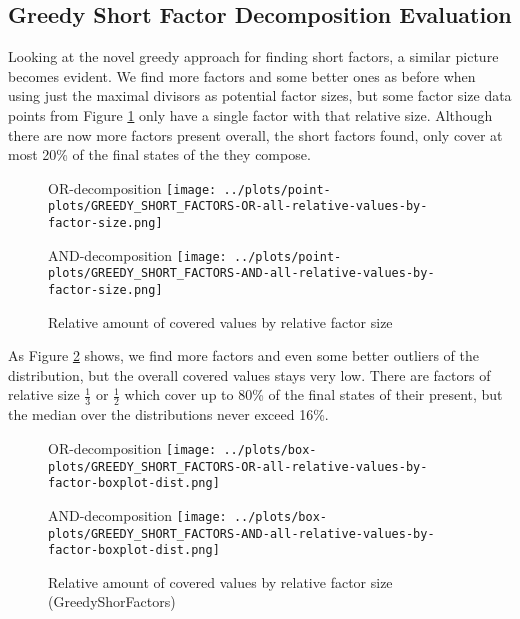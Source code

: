 \subsection{Greedy Short Factor Decomposition Evaluation}
Looking at the novel greedy approach for finding short factors, a similar picture becomes evident.
We find more factors and some better ones as before when using just the maximal divisors as potential factor sizes, but some factor size data points from Figure \ref{fig:eval:greedy-short-factors-all-factors} only have a single factor with that relative size.
Although there are now more factors present overall, the short factors found, only cover at most 20\% of the final states of the \DFA they compose.
\begin{figure}[h]
	\begin{minipage}[h]{0.49\linewidth}
		\centering
		OR-decomposition
		\texttt{[image: ../plots/point-plots/GREEDY\_SHORT\_FACTORS-OR-all-relative-values-by-factor-size.png]}
	\end{minipage}
	\begin{minipage}[h]{0.49\linewidth}
		\centering
		AND-decomposition
		\texttt{[image: ../plots/point-plots/GREEDY\_SHORT\_FACTORS-AND-all-relative-values-by-factor-size.png]}
	\end{minipage}
	\caption{Relative amount of covered values by relative factor size}
	\label{fig:eval:greedy-short-factors-all-factors}
\end{figure}
As Figure \ref{fig:eval:greedy-short-factors-all-factors-box-plot} shows, we find more factors and even some better outliers of the distribution, but the overall covered values stays very low. There are factors of relative size $\frac{1}{3}$ or $\frac{1}{2}$ which cover up to 80\% of the final states of their \DFA present, but the median over the distributions never exceed 16\%. 
\begin{figure}[t]
	\begin{minipage}[h]{0.49\linewidth}
		\centering
		OR-decomposition
		\texttt{[image: ../plots/box-plots/GREEDY\_SHORT\_FACTORS-OR-all-relative-values-by-factor-boxplot-dist.png]}
	\end{minipage}
	\begin{minipage}[h]{0.49\linewidth}
		\centering
		AND-decomposition
		\texttt{[image: ../plots/box-plots/GREEDY\_SHORT\_FACTORS-AND-all-relative-values-by-factor-boxplot-dist.png]}
	\end{minipage}
	\caption{Relative amount of covered values by relative factor size (GreedyShorFactors)}
	\label{fig:eval:greedy-short-factors-all-factors-box-plot}
\end{figure}

